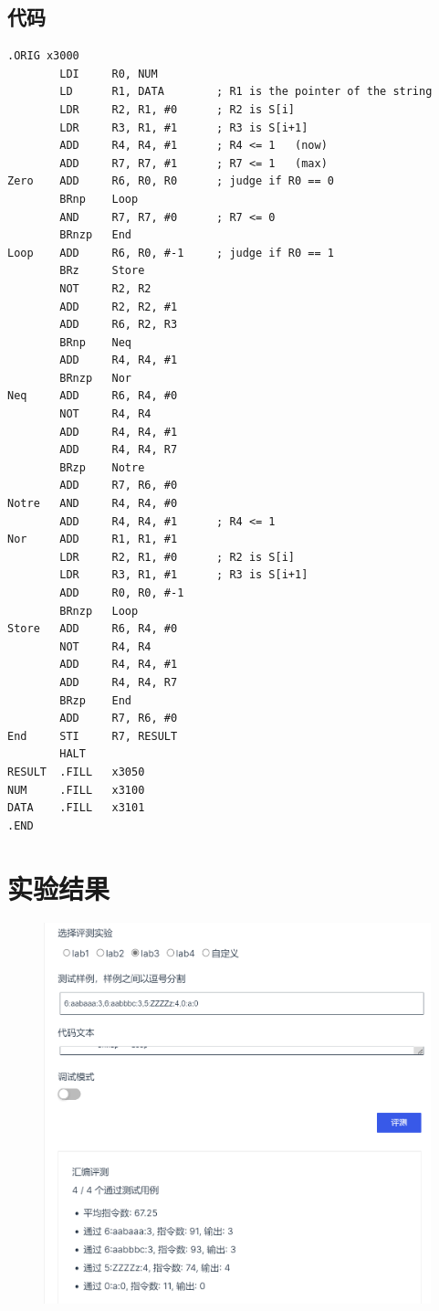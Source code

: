 \documentclass[UTF8]{ctexart}
\begin{document}
\subsection{代码}    
\begin{lstlisting}[basicstyle=\ttfamily,language={[x86masm]Assembler}]
    .ORIG x3000
        LDI     R0, NUM
        LD      R1, DATA        ; R1 is the pointer of the string
        LDR     R2, R1, #0      ; R2 is S[i]
        LDR     R3, R1, #1      ; R3 is S[i+1]
        ADD     R4, R4, #1      ; R4 <= 1   (now)
        ADD     R7, R7, #1      ; R7 <= 1   (max)
Zero    ADD     R6, R0, R0      ; judge if R0 == 0 
        BRnp    Loop  
        AND     R7, R7, #0      ; R7 <= 0
        BRnzp   End
Loop    ADD     R6, R0, #-1     ; judge if R0 == 1
        BRz     Store
        NOT     R2, R2
        ADD     R2, R2, #1
        ADD     R6, R2, R3      
        BRnp    Neq
        ADD     R4, R4, #1
        BRnzp   Nor
Neq     ADD     R6, R4, #0
        NOT     R4, R4
        ADD     R4, R4, #1
        ADD     R4, R4, R7
        BRzp    Notre
        ADD     R7, R6, #0
Notre   AND     R4, R4, #0
        ADD     R4, R4, #1      ; R4 <= 1
Nor     ADD     R1, R1, #1
        LDR     R2, R1, #0      ; R2 is S[i]
        LDR     R3, R1, #1      ; R3 is S[i+1]
        ADD     R0, R0, #-1
        BRnzp   Loop
Store   ADD     R6, R4, #0
        NOT     R4, R4
        ADD     R4, R4, #1
        ADD     R4, R4, R7
        BRzp    End
        ADD     R7, R6, #0
End     STI     R7, RESULT
        HALT
RESULT  .FILL   x3050
NUM     .FILL   x3100
DATA    .FILL   x3101
.END
\end{lstlisting}

\section{实验结果}
    \begin{figure}[htbp]
        \centering
        \includegraphics[scale=0.8]{r.png}
    \end{figure}
\end{document}
